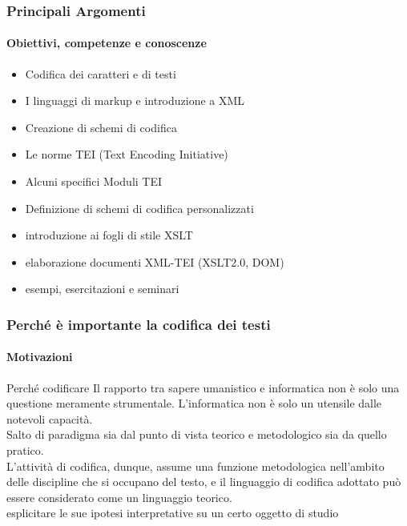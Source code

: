 \begin{frame}
    \frametitle{Principali Argomenti}
    \framesubtitle{Obiettivi, competenze e conoscenze}
    \addtocounter{nframe}{1}

    
        \begin{itemize}
            \item Codifica dei caratteri e di testi
            \item I linguaggi di markup e introduzione a XML
            \item Creazione di schemi di codifica
            \item Le norme TEI (Text Encoding Initiative)
            \item Alcuni specifici Moduli TEI
            \item Definizione di schemi di codifica personalizzati
            \item introduzione ai fogli di stile XSLT
            \item elaborazione documenti XML-TEI (XSLT2.0, DOM)
            \item esempi, esercitazioni e seminari 
        \end{itemize}
    

\end{frame}


\begin{frame}
    \frametitle{Perché è importante la codifica dei testi}
    \framesubtitle{Motivazioni}
    \addtocounter{nframe}{1}
    
    \begin{block}{Perché codificare}
    Il rapporto tra sapere umanistico e informatica non è solo una questione meramente strumentale. L'informatica non è solo un utensile dalle notevoli capacità.
    \\ Salto di paradigma sia dal punto di vista teorico e metodologico sia da quello pratico.
    \\ L’attività di codifica, dunque, assume una funzione metodologica nell’ambito delle discipline che si occupano del testo, e il linguaggio di codifica adottato può essere considerato come un linguaggio teorico.
    \\ esplicitare le sue ipotesi interpretative su un certo oggetto di studio
    \end{block}


\end{frame}

